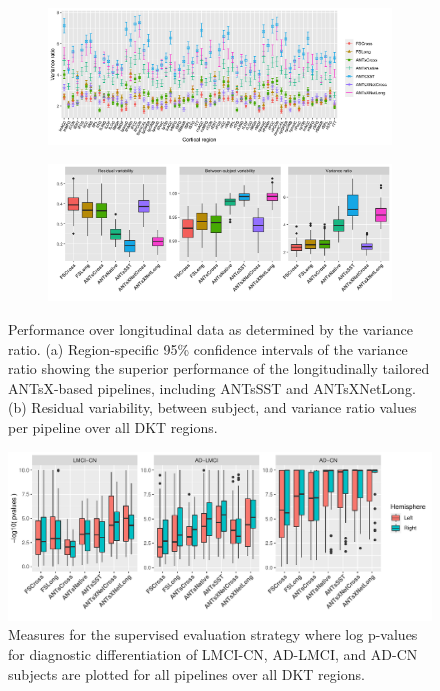\documentclass[12pt,]{article}
\begin{document}
\begin{figure}[!htb]
  \centering
  \begin{subfigure}{0.95\textwidth}
    \centering
    \includegraphics[width=1.0\linewidth]{Figures/variance.ratio_FINALX.png}
    \caption{}
  \end{subfigure}
  \begin{subfigure}{0.95\textwidth}
    \centering
    \includegraphics[width=1\linewidth]{Figures/allData_FINALX2.png}
    \caption{}
  \end{subfigure}
  \caption{Performance over longitudinal data as determined by the variance ratio.
    (a) Region-specific 95\% confidence intervals of the variance ratio showing the
    superior performance of the longitudinally tailored ANTsX-based pipelines, including
    ANTsSST and ANTsXNetLong. (b) Residual variability, between subject, and variance ratio
    values per pipeline over all DKT regions. }
\label{fig:longeval1}
\end{figure}

\begin{figure}[!htb]
  \centering
    \includegraphics[width=1.0\linewidth]{Figures/logPvalues2.pdf}
  \caption{Measures for the supervised evaluation
  strategy where log p-values for diagnostic
  differentiation of LMCI-CN, AD-LMCI, and AD-CN subjects are plotted for all pipelines
  over all DKT regions. }
  \label{fig:longeval2}
\end{figure}
\end{document}
